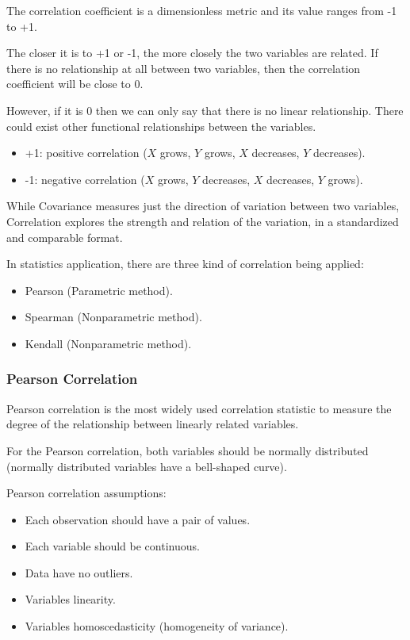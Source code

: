 \documentclass{article}
\begin{document}
The correlation coefficient is a dimensionless metric and its value ranges from -1 to +1. 

The closer it is to +1 or -1, the more closely the two variables are related. 
If there is no relationship at all between two variables, then the correlation coefficient will be close to 0. 

However, if it is 0 then we can only say that there is no linear relationship. There could exist other functional relationships between the variables.

\begin{itemize}
    \item +1: positive correlation ($X$ grows, $Y$ grows, $X$ decreases, $Y$ decreases).
    \item -1: negative correlation ($X$ grows, $Y$ decreases, $X$ decreases, $Y$ grows).
\end{itemize}

While Covariance measures just the direction of variation between two variables, Correlation explores the strength and relation of the variation, in a standardized and comparable format.

In statistics application, there are three kind of correlation being applied:

\begin{itemize}
    \item Pearson (Parametric method).
    \item Spearman (Nonparametric method).
    \item Kendall (Nonparametric method).
\end{itemize}

\subsubsection{Pearson Correlation}
Pearson correlation is the most widely used correlation statistic to measure the degree of the relationship between linearly related variables. 

For the Pearson correlation, both variables should be normally distributed (normally distributed variables have a bell-shaped curve). 

Pearson correlation assumptions:
\begin{itemize}
    \item Each observation should have a pair of values.
    \item Each variable should be continuous.
    \item Data have no outliers.
    \item Variables linearity.
    \item Variables homoscedasticity (homogeneity of variance).
\end{itemize}
\end{document}

